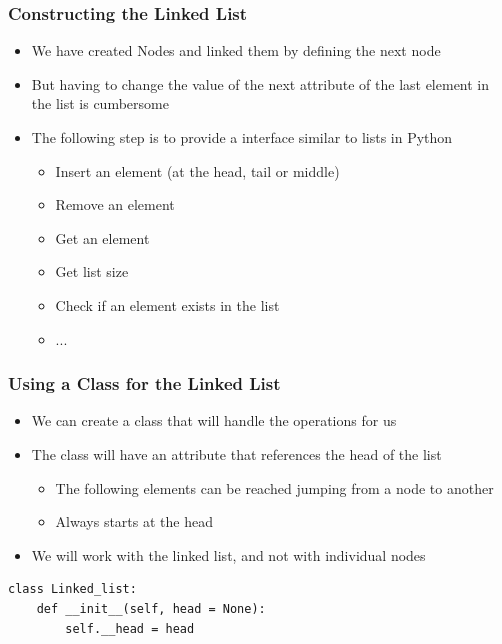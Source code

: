 \documentclass[11pt]{beamer}
\begin{document}
	\begin{frame}
		\frametitle{Constructing the Linked List}
		\begin{itemize}
			\item We have created Nodes and linked them by defining the next node
			\item But having to change the value of the next attribute of the last element in the list is cumbersome
			\item The following step is to provide a interface similar to lists in Python
			\begin{itemize}
				\item Insert an element (at the head, tail or middle)
				\item Remove an element
				\item Get an element
				\item Get list size
				\item Check if an element exists in the list
				\item ...
			\end{itemize}
		\end{itemize}
		\vspace{0.7cm}
		\begin{center}
		\end{center}
	\end{frame}

	\begin{frame}[fragile]
		\frametitle{Using a Class for the Linked List}
		\begin{itemize}
		\item We can create a class that will handle the operations for us
		\item The class will have an attribute that references the head of the list
			\begin{itemize}
				\item The following elements can be reached jumping from a node to another
				\item Always starts at the head
			\end{itemize}
		\item We will work with the linked list, and not with individual nodes
		\end{itemize}
\begin{lstlisting}
class Linked_list:
	def __init__(self, head = None):
		self.__head = head
\end{lstlisting}
	\end{frame}
\end{document}

